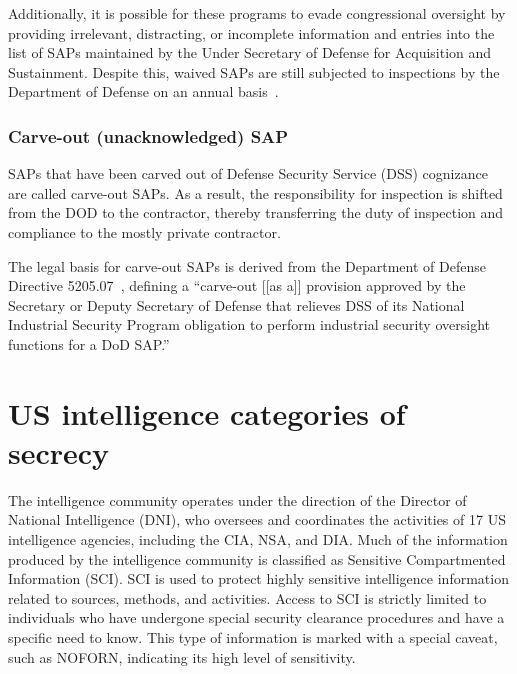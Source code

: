 Additionally, it is possible for these programs to evade congressional oversight by providing irrelevant, distracting, or incomplete information and entries into the list of SAPs maintained by the Under Secretary of Defense for Acquisition and Sustainment. Despite this, waived SAPs are still subjected to inspections by the Department of Defense on an annual basis~\cite{Dolan-MrX-Disclosure2020Jul}.



\subsubsection{Carve-out (unacknowledged) SAP}
\label{2023-UFO-part-Perception-crash-retreivals--cousap}

SAPs that have been carved out of Defense Security Service (DSS) cognizance~\cite{saps2020} are called carve-out SAPs.
As a result, the responsibility for inspection is shifted from the DOD to the contractor, thereby transferring the duty of inspection and compliance to the mostly private contractor.

The legal basis for carve-out SAPs is derived from the Department of Defense Directive 5205.07~\cite{DODDirective5205.07}, defining
a ``carve-out [[as a]]  provision approved by the Secretary or Deputy Secretary of Defense that relieves
DSS of its National Industrial Security Program obligation to perform industrial security
oversight functions for a DoD SAP.''



\section{US intelligence categories of secrecy}
\label{2023-UFO-part-Perception-crash-retreivals--USICOS}


The intelligence community operates under the direction of the Director of National Intelligence (DNI),
who oversees and coordinates the activities of 17 US intelligence agencies,
including the CIA, NSA, and DIA. Much of the information produced by the intelligence community
is classified as Sensitive Compartmented Information (SCI).
SCI is used to protect highly sensitive intelligence information related to sources, methods, and activities.
Access to SCI is strictly limited to individuals who have undergone special security clearance procedures
and have a specific need to know. This type of information is marked with a special caveat, such as NOFORN,
indicating its high level of sensitivity.

